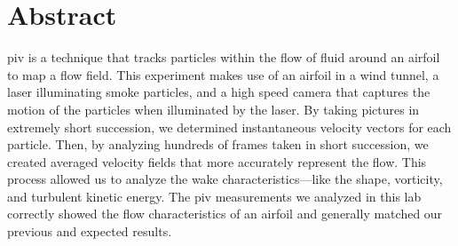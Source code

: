 \thispagestyle{plain} %



\chapter*{Abstract} %

\acrfull{piv} is a technique that tracks particles within the flow of fluid around an airfoil to map a flow field. This experiment makes use of an airfoil in a wind tunnel, a laser illuminating smoke particles, and a high speed camera that captures the motion of the particles when illuminated by the laser. By taking pictures in extremely short succession, we determined instantaneous velocity vectors for each particle. Then, by analyzing hundreds of frames taken in short succession, we created averaged velocity fields that more accurately represent the flow. This process allowed us to analyze the wake characteristics—like the shape, vorticity, and turbulent kinetic energy. The \acrshort{piv} measurements we analyzed in this lab correctly showed the flow characteristics of an airfoil and generally matched our previous and expected results.